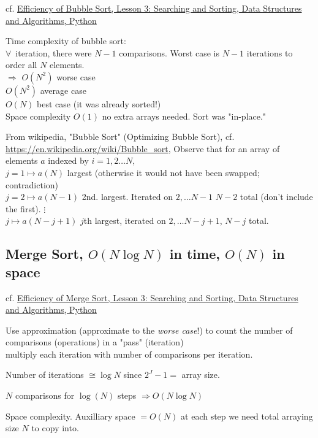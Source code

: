 \documentclass[10pt]{amsart}
\begin{document}
\begin{multicols*}{2}
cf. \href{https://classroom.udacity.com/courses/ud513/lessons/7123524086/concepts/71191848070923}{Efficiency of Bubble Sort, Lesson 3: Searching and Sorting, Data Structures and Algorithms, Python}

Time complexity of bubble sort: \\
$\forall \, $ iteration, there were $N-1$ comparisons. Worst case is $N - 1$ iterations to order all $N$ elements. \\
$\Longrightarrow $ $O(N^2)$ worse case \\
\phantom{$\Longrightarrow$} $O(N^2)$ average case \\
\phantom{$\Longrightarrow$} $O(N)$ best case (it was already sorted!) \\

Space complexity $O(1)$ no extra arrays needed. Sort was "in-place."

From wikipedia, "Bubble Sort" (Optimizing Bubble Sort), cf. \url{https://en.wikipedia.org/wiki/Bubble_sort}, Observe that for an array of elements $a$ indexed by $i = 1, 2 \dots N$,  \\
$j = 1 \mapsto a(N) $ largest (otherwise it would not have been swapped; contradiction) \\
$j = 2 \mapsto a(N-1)$ 2nd. largest. Iterated on $ 2, \dots N-1$ $N-2$ total (don't include the first).
$ \vdots$ \\
$ j \mapsto a(N-j +1)$ $j$th largest, iterated on $2, \dots N- j +1$, $N-j$ total.

\subsection{Merge Sort, $O(N \log{N})$ in time, $O(N)$ in space}

cf. \href{https://classroom.udacity.com/courses/ud513/lessons/7123524086/concepts/71254347930923}{Efficiency of Merge Sort, Lesson 3: Searching and Sorting, Data Structures and Algorithms, Python}

Use approximation (approximate to the \emph{worse case}!) to count the number of comparisons (operations) in a "pass" (iteration) \\
multiply each iteration with number of comparisons per iteration.

Number of iterations $\cong \log{N}$ since $2^J - 1 = $ array size. 

$N$ comparisons for $\log{(N)}$ steps $\Longrightarrow O(N \log{N})$

Space complexity. Auxilliary space $=O(N)$ at each step we need total arraying size $N$ to copy into.


\end{multicols*}
\end{document}
